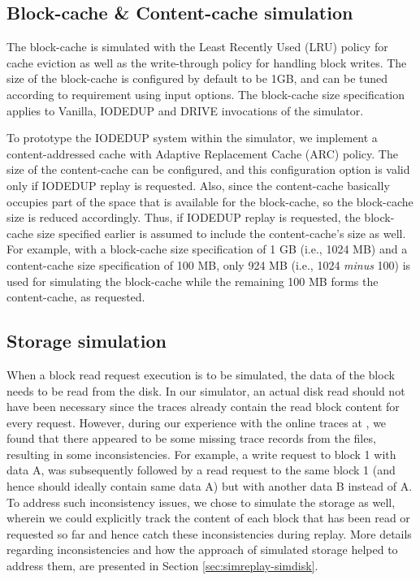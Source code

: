 \subsection{Block-cache \& Content-cache simulation}
The block-cache is simulated with the Least Recently Used (LRU) policy
for cache eviction as well as the write-through policy for handling
block writes. The size of the block-cache is configured by default 
to be 1GB, and can be tuned according to requirement using input options.
The block-cache size specification applies to Vanilla, IODEDUP and DRIVE
invocations of the simulator. 

To prototype the IODEDUP system within the simulator, we implement a 
content-addressed cache with Adaptive Replacement Cache (ARC) policy.
The size of the content-cache can be configured, and this configuration
option is valid only if IODEDUP replay is requested. Also, since
the content-cache basically occupies part of the space that is available
for the block-cache, so the block-cache size is reduced accordingly.
Thus, if IODEDUP replay is requested, the block-cache size specified earlier
is assumed to include the content-cache's size as well.
For example, with a block-cache size specification of 1 GB (i.e., 1024 MB) and 
a content-cache size specification of 100 MB, only 
924 MB (i.e., 1024 \textit{minus} 100) is used
for simulating the block-cache while the remaining 100 MB forms the
content-cache, as requested.

\subsection{Storage simulation}
When a block read request execution is to be simulated, the data of the
block needs to be read from the disk. In our simulator, an
actual disk read should not have been necessary since the traces already 
contain the read block content for every request. However, during our
experience with the online traces at \cite{iodedup-online}, we found that
there appeared to be some missing trace records from the files, resulting
in some inconsistencies. For example, a write request 
to block 1 with data A, was subsequently followed by a read request to the
same block 1 (and hence should ideally contain same data A) but with
another data B instead of A. To address such inconsistency issues,
we chose to simulate the storage as well, wherein we could explicitly track
the content of each block that has been read or requested so far and hence
catch these inconsistencies during replay. More details regarding 
inconsistencies and how the approach of simulated storage helped to address 
them, are presented in Section \ref{sec:simreplay-simdisk}.

